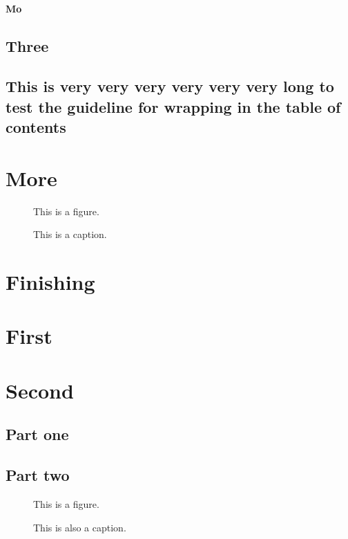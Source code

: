 \documentclass{utthesis}
\begin{document}
\subsubsection{Mo}
\section{Three}
\section{This is very very very very very very long to test the guideline for wrapping in the table of contents}

\chapter{More}
\lipsum[3]
\begin{figure}
This is a figure.
\caption[This]{This is a caption.}
\end{figure}

\chapter{Finishing}
\lipsum[3]

\begin{appendix}

\chapter{First}
\lipsum[3]

\chapter{Second}
\section{Part one}
\lipsum[3]
\section{Part two}
\begin{figure}
This is a figure.
\caption[That]{This is also a caption.}
\end{figure}

\end{appendix}

\backmatter

\printindex

\cleardoublepage
{}

\end{document}
